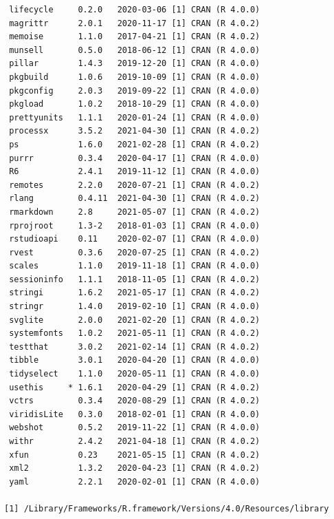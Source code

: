 \documentclass [11pt, proquest] {uwthesis}[2015/03/03]
\begin{document}
\begin{verbatim}
 lifecycle     0.2.0   2020-03-06 [1] CRAN (R 4.0.0)                       
 magrittr      2.0.1   2020-11-17 [1] CRAN (R 4.0.2)                       
 memoise       1.1.0   2017-04-21 [1] CRAN (R 4.0.2)                       
 munsell       0.5.0   2018-06-12 [1] CRAN (R 4.0.0)                       
 pillar        1.4.3   2019-12-20 [1] CRAN (R 4.0.0)                       
 pkgbuild      1.0.6   2019-10-09 [1] CRAN (R 4.0.0)                       
 pkgconfig     2.0.3   2019-09-22 [1] CRAN (R 4.0.0)                       
 pkgload       1.0.2   2018-10-29 [1] CRAN (R 4.0.0)                       
 prettyunits   1.1.1   2020-01-24 [1] CRAN (R 4.0.0)                       
 processx      3.5.2   2021-04-30 [1] CRAN (R 4.0.2)                       
 ps            1.6.0   2021-02-28 [1] CRAN (R 4.0.2)                       
 purrr         0.3.4   2020-04-17 [1] CRAN (R 4.0.0)                       
 R6            2.4.1   2019-11-12 [1] CRAN (R 4.0.0)                       
 remotes       2.2.0   2020-07-21 [1] CRAN (R 4.0.2)                       
 rlang         0.4.11  2021-04-30 [1] CRAN (R 4.0.2)                       
 rmarkdown     2.8     2021-05-07 [1] CRAN (R 4.0.2)                       
 rprojroot     1.3-2   2018-01-03 [1] CRAN (R 4.0.0)                       
 rstudioapi    0.11    2020-02-07 [1] CRAN (R 4.0.0)                       
 rvest         0.3.6   2020-07-25 [1] CRAN (R 4.0.2)                       
 scales        1.1.0   2019-11-18 [1] CRAN (R 4.0.0)                       
 sessioninfo   1.1.1   2018-11-05 [1] CRAN (R 4.0.2)                       
 stringi       1.6.2   2021-05-17 [1] CRAN (R 4.0.2)                       
 stringr       1.4.0   2019-02-10 [1] CRAN (R 4.0.0)                       
 svglite       2.0.0   2021-02-20 [1] CRAN (R 4.0.2)                       
 systemfonts   1.0.2   2021-05-11 [1] CRAN (R 4.0.2)                       
 testthat      3.0.2   2021-02-14 [1] CRAN (R 4.0.2)                       
 tibble        3.0.1   2020-04-20 [1] CRAN (R 4.0.0)                       
 tidyselect    1.1.0   2020-05-11 [1] CRAN (R 4.0.0)                       
 usethis     * 1.6.1   2020-04-29 [1] CRAN (R 4.0.2)                       
 vctrs         0.3.4   2020-08-29 [1] CRAN (R 4.0.2)                       
 viridisLite   0.3.0   2018-02-01 [1] CRAN (R 4.0.0)                       
 webshot       0.5.2   2019-11-22 [1] CRAN (R 4.0.0)                       
 withr         2.4.2   2021-04-18 [1] CRAN (R 4.0.2)                       
 xfun          0.23    2021-05-15 [1] CRAN (R 4.0.2)                       
 xml2          1.3.2   2020-04-23 [1] CRAN (R 4.0.2)                       
 yaml          2.2.1   2020-02-01 [1] CRAN (R 4.0.0)                       

[1] /Library/Frameworks/R.framework/Versions/4.0/Resources/library
\end{verbatim}
\backmatter
\end{document}
